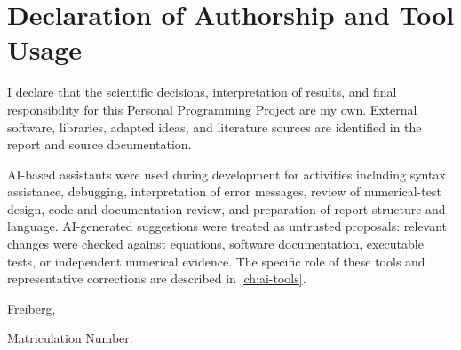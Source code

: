 \chapter*{Declaration of Authorship and Tool Usage}

I declare that the scientific decisions, interpretation of results, and final
responsibility for this Personal Programming Project are my own. External
software, libraries, adapted ideas, and literature sources are identified in
the report and source documentation.

AI-based assistants were used during development for activities including
syntax assistance, debugging, interpretation of error messages, review of
numerical-test design, code and documentation review, and preparation of
report structure and language. AI-generated suggestions were treated as
untrusted proposals: relevant changes were checked against equations,
software documentation, executable tests, or independent numerical evidence.
The specific role of these tools and representative corrections are described
in \cref{ch:ai-tools}.

\vfill
\noindent Freiberg, \SubmissionDate
\vspace{15mm}

\noindent\ReportAuthor\hfill Matriculation Number: \MatriculationNumber

\clearpage
